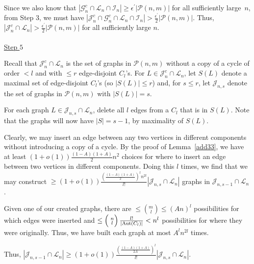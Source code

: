 \documentclass{article}
\newtheorem{Proof of Theorem}{Proof of Theorem}
\begin{document}
Since we also know that
$|\mathcal{G}_{n}^{c} \cap \mathcal{L}_{n} \cap \mathcal{I}_{n}| \geq \epsilon^{\prime} |\mathcal{P}(n,m)|$
for all sufficiently large~$n$,
from Step $3$,
we must have
$|\mathcal{J}_{n}^{c} \cap \mathcal{G}_{n}^{c} \cap \mathcal{L}_{n} \cap \mathcal{I}_{n}| > 
\frac{\epsilon^{\prime}}{2} |\mathcal{P}(n,m)|$.
Thus, $|\mathcal{J}_{n}^{c} \cap \mathcal{L}_{n}| > \frac{\epsilon^{\prime}}{2} |\mathcal{P}(n,m)|$
for all sufficiently large $n$. \\
\\
\underline{Step $5$}

Recall that $\mathcal{J}_{n}^{c} \cap \mathcal{L}_{n}$
is the set of graphs in $\mathcal{P}(n,m)$ without a copy of a cycle of order $<l$
and with $\leq r$ edge-disjoint $C_{l}$'s.
For $L \in \mathcal{J}_{n}^{c} \cap \mathcal{L}_{n}$,
let $S(L)$ denote a maximal set of edge-disjoint $C_{l}$'s (so $|S(L)| \leq r$)
and, for $s \leq r$, let $\mathcal{J}_{n,s}$ denote the set of graphs in $\mathcal{P}(n,m)$ with $|S(L)|=s$.

For each graph $L \in \mathcal{J}_{n,s} \cap \mathcal{L}_{n}$,
delete all $l$ edges from a $C_{l}$ that is in $S(L)$.
Note that the graphs will now have $|S|=s-1$,
by maximality of $S(L)$.

Clearly, we may insert an edge between any two vertices in different components
without introducing a copy of a cycle.
By the proof of Lemma~\ref{add33},
we have at least $(1+o(1)) \frac{(1-A)(1+A)}{2} n^{2}$ choices 
for where to insert an edge between two vertices in different components.
Doing this $l$ times,
we find that we may construct 
$\geq (1+o(1)) \frac{ \left( \frac{(1-A)(1+A)}{2} \right)^{l} n^{2l} }{l!} |\mathcal{J}_{n,s} \cap \mathcal{L}_{n}|$
graphs in $\mathcal{J}_{n,s-1} \cap \mathcal{L}_{n}$.

Given one of our created graphs,
there are $\leq \left( ^{m}_{\phantom{i}l} \right) \leq (An)^{l}$ possibilities for which edges were inserted 
and 
$\leq \left( ^{\phantom{i}n}_{\phantom{q}l} \right) \frac{l!}{|\textrm{\scriptsize{Aut}}(C_{l})|} < n^{l}$ 
possibilities for where they were originally.
Thus, we have built each graph at most $A^{l}n^{2l}$ times.

Thus, 
$|\mathcal{J}_{n,s-1} \cap \mathcal{L}_{n}| \geq 
(1+o(1)) \frac{ \left( \frac{(1-A)(1+A)}{2A} \right)^{l} }{l!} |\mathcal{J}_{n,s} \cap \mathcal{L}_{n}|$.
\end{document}
